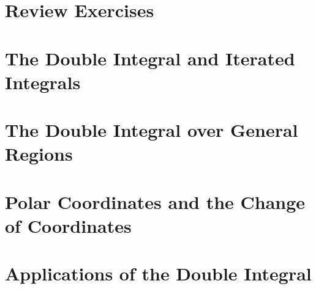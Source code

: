\documentclass[a4paper, 11pt]{article}
\begin{document}
\section{Review Exercises}


\section{The Double Integral and Iterated Integrals}


\section{The Double Integral over General Regions}


\section{Polar Coordinates and the Change of Coordinates}


\section{Applications of the Double Integral}

\end{document}
